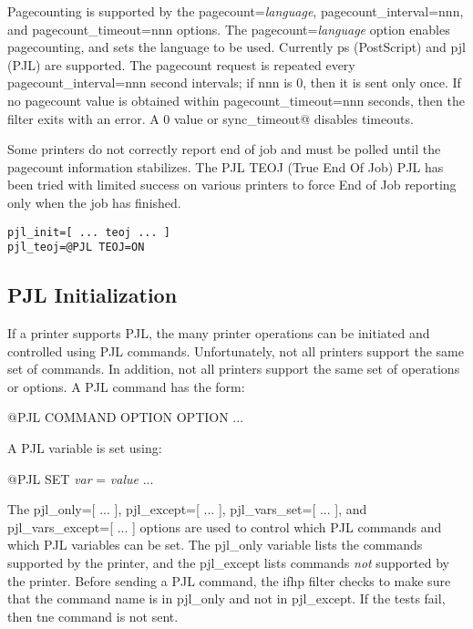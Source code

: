 \documentclass[a4paper]{article}
\begin{document}
Pagecounting is supported by the
{\ttfamily pagecount=}{\itshape language\/},
{\ttfamily pagecount\_interval=nnn},
and
{\ttfamily pagecount\_timeout=nnn}
options.
The
{\ttfamily pagecount=}{\itshape language\/}
option enables pagecounting, and sets the language to be used.
Currently
{\ttfamily ps} (PostScript)
and
{\ttfamily pjl} (PJL)
are supported.
The pagecount request is repeated every
{\ttfamily pagecount\_interval=nnn}
second intervals; if nnn is 0, then it is sent only once.
If no pagecount value is obtained within
{\ttfamily pagecount\_timeout=nnn}
seconds, then the filter exits with an error.
A 0 value or
{\ttfamily sync\_timeout@}
disables timeouts.

Some printers do not correctly report end of job and must be polled
until the pagecount information stabilizes.
The PJL TEOJ (True End Of Job) PJL has been tried with limited success
on various printers to force End of Job reporting only when the
job has finished.
\begin{tscreen}
\begin{verbatim}
pjl_init=[ ... teoj ... ]
pjl_teoj=@PJL TEOJ=ON
\end{verbatim}
\end{tscreen}



\subsection{PJL Initialization
\label{pjlinit}
\label{endpage}
\label{startpage}
\label{pjl_only}
\label{pjl_except}
\label{pjl_vars_set}
\label{pjl_vars_except}
\label{pjl_user_opts}
\label{pjl_init}}

If a printer supports PJL,
the many printer operations can be initiated and controlled using
PJL commands.
Unfortunately,
not all printers support the same set of commands.
In addition,
not all printers support the same set of operations or options.
A PJL command has the form:
\begin{tscreen}
@PJL COMMAND OPTION OPTION ...
\end{tscreen}

A PJL variable is set using:
\begin{tscreen}
@PJL SET {\itshape var\/} = {\itshape value\/} ...
\end{tscreen}

The
{\ttfamily pjl\_only={[} ... {]}},
{\ttfamily pjl\_except={[} ... {]}},
{\ttfamily pjl\_vars\_set={[} ... {]}},
and
{\ttfamily pjl\_vars\_except={[} ... {]}}
options are used to control which PJL commands and which PJL variables
can be set.
The 
{\ttfamily pjl\_only}
variable lists the commands supported by the printer,
and the
{\ttfamily pjl\_except}
lists commands {\itshape not\/}
supported by the printer.
Before sending a PJL command,
the
{\ttfamily ifhp}
filter checks to make sure that the command name is in
{\ttfamily pjl\_only}
and not in
{\ttfamily pjl\_except}.
If the tests fail, then tne command is not sent.
\end{document}
